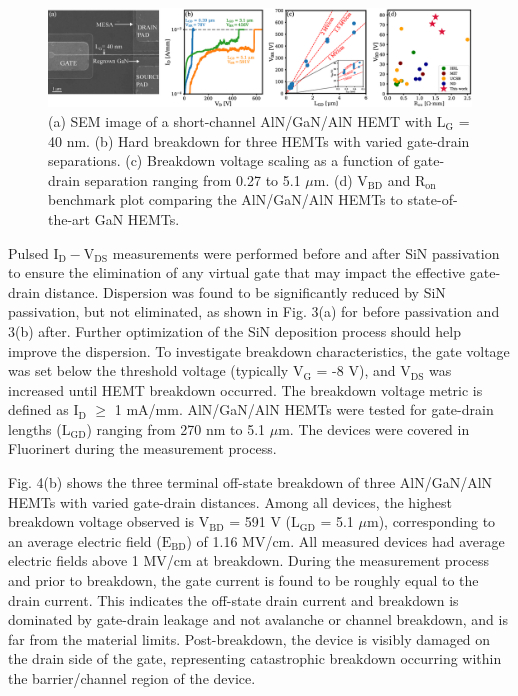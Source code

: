 \documentclass[journal]{IEEEtran}
\begin{document}
\begin{figure}[!t]
\centering
\includegraphics[width=\textwidth]{Figure4_withSEM.eps}
\caption{ (a) SEM image of a short-channel AlN/GaN/AlN HEMT with $\mathrm{L_G}$ = 40 nm. (b) Hard breakdown for three HEMTs with varied gate-drain separations. (c) Breakdown voltage scaling as a function of gate-drain separation ranging from 0.27 to 5.1 $\mu$m. (d) $\mathrm{V_{BD}}$ and $\mathrm{R_{on}}$ benchmark plot comparing the AlN/GaN/AlN HEMTs to state-of-the-art GaN HEMTs. }
\label{fig:benchmark}
\end{figure}


Pulsed $\mathrm{I_D-V_{DS}}$ measurements were performed before and after SiN passivation to ensure the elimination of any virtual gate that may impact the effective gate-drain distance. Dispersion was found to be significantly reduced by SiN passivation, but not eliminated, as shown in Fig. 3(a) for before passivation and 3(b) after. Further optimization of the SiN deposition process should help improve the dispersion. To investigate breakdown characteristics, the gate voltage was set below the threshold voltage (typically $\mathrm{V_G}$ = -8 V), and $\mathrm{V_{DS}}$ was increased until HEMT breakdown occurred. The breakdown voltage metric is defined as $\mathrm{I_D}$ $\geq$ 1 mA/mm. AlN/GaN/AlN HEMTs were tested for gate-drain lengths ($\mathrm{L_{GD}}$) ranging from 270 nm to 5.1 $\mu$m. The devices were covered in Fluorinert during the measurement process.

Fig. 4(b) shows the three terminal off-state breakdown of three AlN/GaN/AlN HEMTs with varied gate-drain distances. Among all devices, the highest breakdown voltage observed is $\mathrm{V_{BD}}$ = 591 V ($\mathrm{L_{GD}}$ = 5.1 $\mu$m), corresponding to an average electric field ($\mathrm{E_{BD}}$) of 1.16 MV/cm. All measured devices had average electric fields above 1 MV/cm at breakdown. During the measurement process and prior to breakdown, the gate current is found to be roughly equal to the drain current. This indicates the off-state drain current and breakdown is dominated by gate-drain leakage and not avalanche or channel breakdown, and is far from the material limits. Post-breakdown, the device is visibly damaged on the drain side of the gate, representing catastrophic breakdown occurring within the barrier/channel region of the device.
\end{document}
